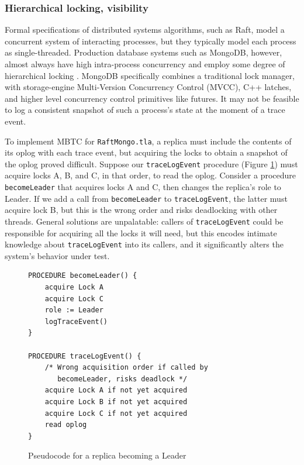 \documentclass{vldb}
\begin{document}
\subsubsection{Hierarchical locking, visibility}
\label{subsubsec:mbtc_locking}

Formal specifications of distributed systems algorithms, such as Raft, model a concurrent system of interacting processes, but they typically model each process as single-threaded. 
Production database systems such as MongoDB, however, almost always have high intra-process concurrency and employ some degree of hierarchical locking \cite{Gray76SharedLocks}. 
MongoDB specifically combines a traditional lock manager, with storage-engine Multi-Version Concurrency Control (MVCC), C++ latches, and higher level concurrency control primitives like futures.
It may not be feasible to log a consistent snapshot of such a process's state at the moment of a trace event.


To implement MBTC for \texttt{RaftMongo.tla}, a replica must include the contents of its oplog with each trace event,
but acquiring the locks to obtain a snapshot of the oplog proved difficult. 
Suppose our \texttt{traceLogEvent} procedure (Figure \ref{fig:traceLogEvent}) must acquire locks A, B, and C, in that order, to read the oplog.
Consider a procedure \texttt{becomeLeader} that acquires locks A and C, then changes the replica's role to Leader. 
If we add a call from \texttt{becomeLeader} to \texttt{traceLogEvent}, the latter must acquire lock B, but this is the wrong order and risks deadlocking with other threads.
General solutions are unpalatable: callers of \texttt{traceLogEvent} could be responsible for acquiring all the locks it will need, but this encodes intimate knowledge about \texttt{traceLogEvent} into its callers, and it significantly alters the system's behavior under test.

\begin{figure}
\begin{verbatim}
PROCEDURE becomeLeader() {
    acquire Lock A
    acquire Lock C
    role := Leader
    logTraceEvent()
}

PROCEDURE traceLogEvent() {
    /* Wrong acquisition order if called by
       becomeLeader, risks deadlock */
    acquire Lock A if not yet acquired
    acquire Lock B if not yet acquired
    acquire Lock C if not yet acquired
    read oplog
}
\end{verbatim}
\caption{Pseudocode for a replica becoming a Leader}
\label{fig:traceLogEvent}
\end{figure}
\end{document}
